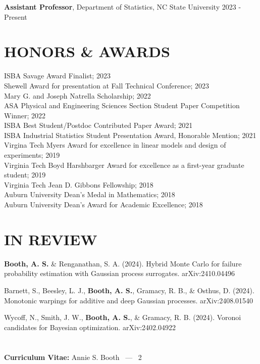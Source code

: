 \documentclass[margin,line,11pt]{res}
\begin{document}
\begin{resume}
{\bf Assistant Professor}, Department of Statistics, 
NC State University \hfill 2023 - Present

\bigskip
\section{\bf HONORS \& AWARDS}

ISBA Savage Award Finalist; 2023 \\
Shewell Award for presentation at Fall Technical Conference; 2023 \\
Mary G. and Joseph Natrella Scholarship; 2022 \\
ASA Physical and Engineering Sciences Section Student Paper Competition Winner; 2022 \\
ISBA Best Student/Postdoc Contributed Paper Award; 2021 \\
ISBA Industrial Statistics Student Presentation Award, Honorable Mention; 2021 \\
Virgina Tech Myers Award for excellence in linear models and design of experiments; 2019 \\
Virginia Tech Boyd Harshbarger Award for excellence as a first-year graduate student; 2019 \\
Virginia Tech Jean D. Gibbons Fellowship; 2018 \\
Auburn University Dean's Medal in Mathematics; 2018 \\
Auburn University Dean's Award for Academic Excellence; 2018

\medskip
\section{\bf{IN REVIEW}}

{\bf Booth, A. S.} \& Renganathan, S. A. (2024). Hybrid Monte Carlo for failure probability estimation with Gaussian process surrogates. arXiv:2410.04496

Barnett, S., Beesley, L. J., {\bf Booth, A. S.}, Gramacy, R. B., \& Osthus, D. (2024). Monotonic 
warpings for additive and deep Gaussian processes. arXiv:2408.01540

Wycoff, N., Smith, J. W., {\bf Booth, A. S.}, \& Gramacy, R. B. (2024). Voronoi candidates 
for Bayesian optimization. arXiv:2402.04922

\pagebreak
\section{}
\hfill {\bf Curriculum Vitae:} Annie S. Booth \  --- \  2
\medskip


\end{resume}
\end{document}
